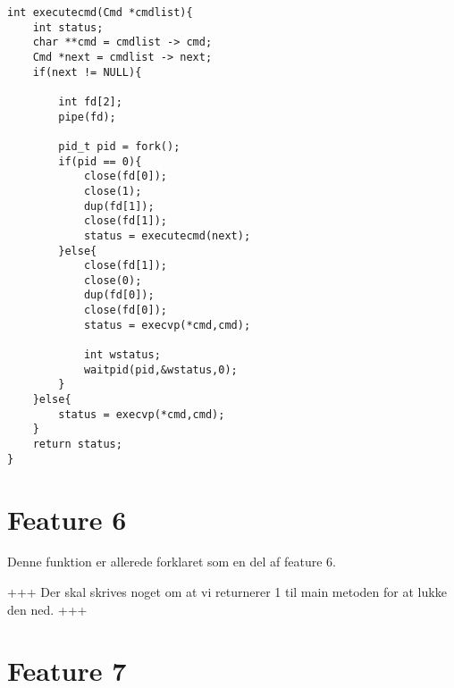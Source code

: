 \documentclass[danish]{report}
\begin{document}
\begin{lstlisting}
int executecmd(Cmd *cmdlist){
    int status;
    char **cmd = cmdlist -> cmd;
    Cmd *next = cmdlist -> next;
    if(next != NULL){

        int fd[2];
        pipe(fd);

        pid_t pid = fork();
        if(pid == 0){
            close(fd[0]);
            close(1);
            dup(fd[1]);
            close(fd[1]);
            status = executecmd(next);
        }else{
            close(fd[1]);
            close(0);
            dup(fd[0]);
            close(fd[0]);
            status = execvp(*cmd,cmd);
            
            int wstatus;
            waitpid(pid,&wstatus,0);
        }
    }else{
        status = execvp(*cmd,cmd);
    }
    return status;
}

\end{lstlisting}

\section{Feature 6}

Denne funktion er allerede forklaret som en del af feature 6. 

+++ Der skal skrives noget om at vi returnerer 1 til main metoden for at lukke den ned. +++

\section{Feature 7}


\begin{lstlisting}

\end{lstlisting}
\end{document}
